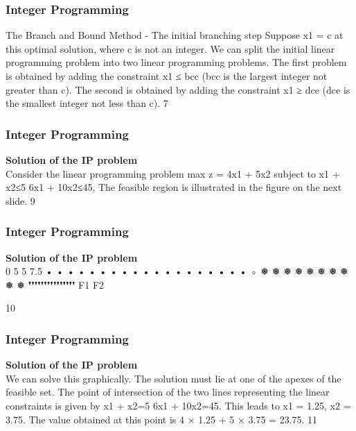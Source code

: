 \begin{frame} 
\frametitle{Integer Programming}     
The Branch and Bound Method - The initial branching
step
Suppose x1 = c at this optimal solution, where c is not an integer.
We can split the initial linear programming problem into two linear
programming problems.
The first problem is obtained by adding the constraint x1 ≤ bcc
(bcc is the largest integer not greater than c).
The second is obtained by adding the constraint x1 ≥ dce (dce is
the smallest integer not less than c).
7 
\end{frame}  
\begin{frame} 
\frametitle{Integer Programming}     
\noindent \textbf{Solution of the IP problem}\\
Consider the linear programming problem
max z = 4x1 + 5x2
subject to
x1 + x2≤5
6x1 + 10x2≤45,
The feasible region is illustrated in the figure on the next slide.
9 
\end{frame}  
\begin{frame} 
\frametitle{Integer Programming}     
\noindent \textbf{Solution of the IP problem}\\
0
5
5 7.5
• • • • • •
• • • • •
• • • •
• • •
•
◦
❅
❅
❅
❅
❅
❅
❅
❅
❅
❅
❜❜❜❜❜❜❜❜❜❜❜❜❜❜❜
F1
F2













10 \end{frame}  
\begin{frame} 
\frametitle{Integer Programming}     
\noindent \textbf{Solution of the IP problem}\\
We can solve this graphically. The solution must lie at one of the
apexes of the feasible set.
The point of intersection of the two lines representing the linear
constraints is given by
x1 + x2=5
6x1 + 10x2=45.
This leads to x1 = 1.25, x2 = 3.75. The value obtained at this
point is 4 × 1.25 + 5 × 3.75 = 23.75.
11 \end{frame}  
